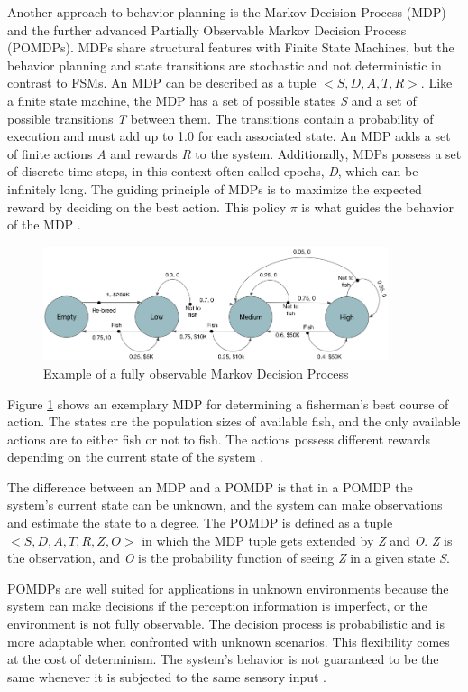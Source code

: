 Another approach to behavior planning is the Markov Decision Process (MDP) and the further advanced Partially Observable Markov Decision Process (POMDPs). MDPs share structural features with Finite State Machines, but the behavior planning and state transitions are stochastic and not deterministic in contrast to FSMs. An MDP can be described as a tuple $<S, D, A, T, R>$. Like a finite state machine, the MDP has a set of possible states \textit{S} and a set of possible transitions \textit{T} between them. The transitions contain a probability of execution and must add up to 1.0 for each associated state. An MDP adds a set of finite actions \textit{A} and rewards \textit{R} to the system. Additionally, MDPs possess a set of discrete time steps, in this context often called epochs, \textit{D}, which can be infinitely long. The guiding principle of MDPs is to maximize the expected reward by deciding on the best action. This policy $\pi$ is what guides the behavior of the MDP \cite{feyzabadi2014riskaware}.

\begin{figure}[ht]
	\centering
	\includegraphics[width=0.9\textwidth]{images/mdp.png} 
	\caption{Example of a fully observable Markov Decision Process \cite{andrew1999reinforcement}}
	\label{fig:mdp}
\end{figure}

Figure \ref{fig:mdp} shows an exemplary MDP for determining a fisherman's best course of action. The states are the population sizes of available fish, and the only available actions are to either fish or not to fish. The actions possess different rewards depending on the current state of the system \cite{tanwar2019markov}. 

The difference between an MDP and a POMDP is that in a POMDP the system's current state can be unknown, and the system can make observations and estimate the state to a degree. The POMDP is defined as a tuple $<S, D, A, T, R, Z, O>$ in which the MDP tuple gets extended by \textit{Z} and \textit{O}. \textit{Z} is the observation, and \textit{O} is the probability function of seeing \textit{Z} in a given state \textit{S}.

POMDPs are well suited for applications in unknown environments because the system can make decisions if the perception information is imperfect, or the environment is not fully observable. The decision process is probabilistic and is more adaptable when confronted with unknown scenarios. This flexibility comes at the cost of determinism. The system's behavior is not guaranteed to be the same whenever it is subjected to the same sensory input \cite{krishnamurthy2016partially}.

